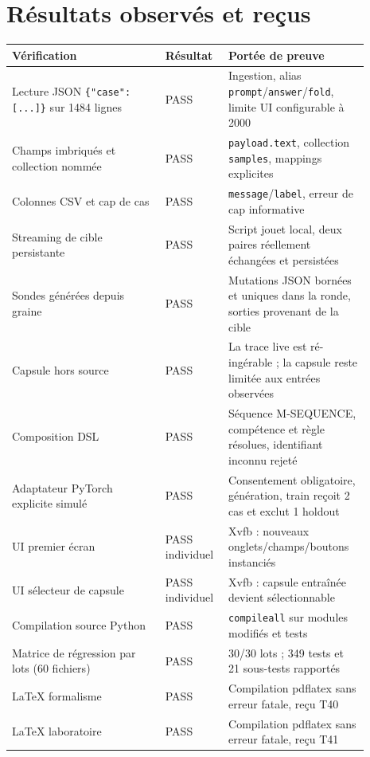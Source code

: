 \documentclass[11pt,a4paper]{article}
\begin{document}
\section{Résultats observés et reçus}
\small\begin{longtable}{|p{0.40\linewidth}|p{0.15\linewidth}|p{0.34\linewidth}|}\hline
\textbf{Vérification} & \textbf{Résultat} & \textbf{Portée de preuve} \\\hline
Lecture JSON \verb|{"case": [...]}| sur 1484 lignes & PASS & Ingestion, alias \verb|prompt|/\verb|answer|/\verb|fold|, limite UI configurable à 2000 \\\hline
Champs imbriqués et collection nommée & PASS & \verb|payload.text|, collection \verb|samples|, mappings explicites \\\hline
Colonnes CSV et cap de cas & PASS & \verb|message|/\verb|label|, erreur de cap informative \\\hline
Streaming de cible persistante & PASS & Script jouet local, deux paires réellement échangées et persistées \\\hline
Sondes générées depuis graine & PASS & Mutations JSON bornées et uniques dans la ronde, sorties provenant de la cible \\\hline
Capsule hors source & PASS & La trace live est ré-ingérable ; la capsule reste limitée aux entrées observées \\\hline
Composition DSL & PASS & Séquence M-SEQUENCE, compétence et règle résolues, identifiant inconnu rejeté \\\hline
Adaptateur PyTorch explicite simulé & PASS & Consentement obligatoire, génération, train reçoit 2 cas et exclut 1 holdout \\\hline
UI premier écran & PASS individuel & Xvfb : nouveaux onglets/champs/boutons instanciés \\\hline
UI sélecteur de capsule & PASS individuel & Xvfb : capsule entraînée devient sélectionnable \\\hline
Compilation source Python & PASS & \verb|compileall| sur modules modifiés et tests \\\hline
Matrice de régression par lots (60 fichiers) & PASS & 30/30 lots ; 349 tests et 21 sous-tests rapportés \\\hline
LaTeX formalisme & PASS & Compilation pdflatex sans erreur fatale, reçu T40 \\\hline
LaTeX laboratoire & PASS & Compilation pdflatex sans erreur fatale, reçu T41 \\\hline
\end{longtable}\normalsize
\end{document}
